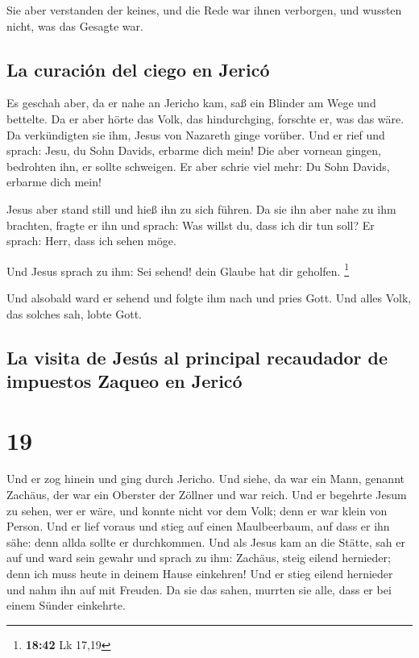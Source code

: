  Sie aber verstanden der keines, und die Rede war ihnen
verborgen, und wussten nicht, was das Gesagte war.

\hypertarget{la-curaciuxf3n-del-ciego-en-jericuxf3}{%
\subsection{La curación del ciego en
Jericó}\label{la-curaciuxf3n-del-ciego-en-jericuxf3}}

 Es geschah aber, da er nahe an Jericho kam, saß ein
Blinder am Wege und bettelte.  Da er aber hörte das Volk,
das hindurchging, forschte er, was das wäre.  Da
verkündigten sie ihm, Jesus von Nazareth ginge vorüber. 
Und er rief und sprach: Jesu, du Sohn Davids, erbarme dich mein!
 Die aber vornean gingen, bedrohten ihn, er sollte
schweigen. Er aber schrie viel mehr: Du Sohn Davids, erbarme dich mein!

 Jesus aber stand still und hieß ihn zu sich führen. Da
sie ihn aber nahe zu ihm brachten, fragte er ihn  und
sprach: Was willst du, dass ich dir tun soll? Er sprach: Herr, dass ich
sehen möge.

 Und Jesus sprach zu ihm: Sei sehend! dein Glaube hat dir
geholfen. \footnote{\textbf{18:42} Lk 17,19}

 Und alsobald ward er sehend und folgte ihm nach und
pries Gott. Und alles Volk, das solches sah, lobte Gott.

\hypertarget{la-visita-de-jesuxfas-al-principal-recaudador-de-impuestos-zaqueo-en-jericuxf3}{%
\subsection{La visita de Jesús al principal recaudador de impuestos
Zaqueo en
Jericó}\label{la-visita-de-jesuxfas-al-principal-recaudador-de-impuestos-zaqueo-en-jericuxf3}}

\hypertarget{section-18}{%
\section{19}\label{section-18}}

 Und er zog hinein und ging durch Jericho. 
Und siehe, da war ein Mann, genannt Zachäus, der war ein Oberster der
Zöllner und war reich.  Und er begehrte Jesum zu sehen,
wer er wäre, und konnte nicht vor dem Volk; denn er war klein von
Person.  Und er lief voraus und stieg auf einen
Maulbeerbaum, auf dass er ihn sähe: denn allda sollte er durchkommen.
 Und als Jesus kam an die Stätte, sah er auf und ward sein
gewahr und sprach zu ihm: Zachäus, steig eilend hernieder; denn ich muss
heute in deinem Hause einkehren!  Und er stieg eilend
hernieder und nahm ihn auf mit Freuden.  Da sie das sahen,
murrten sie alle, dass er bei einem Sünder einkehrte.

